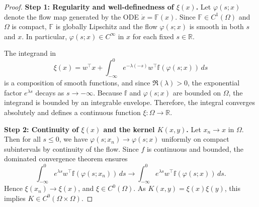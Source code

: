 \documentclass[11pt]{article}
\theoremstyle{plain}
\def\[{\begin{equation}}
\def\]{\end{equation}}
\begin{document}
\begin{proof}
\textbf{Step 1: Regularity and well-definedness of \( \xi(x) \).}  
Let \( \varphi(s; x) \) denote the flow map generated by the ODE \( \dot{x} = {\mathbb F}(x) \). Since \( {\mathbb F} \in C^1(\Omega) \) and \( \Omega \) is compact, \( {\mathbb F} \) is globally Lipschitz and the flow \( \varphi(s; x) \) is smooth in both \( s \) and \( x \). In particular, \( \varphi(s; x) \in C^\infty \) in \( x \) for each fixed \( s \in \mathbb{R} \).

The integrand in
\[
\xi(x) = w^\top x + \int_{-\infty}^0 e^{-\lambda(-s)} w^\top {\mathbb f}(\varphi(s; x)) \, ds
\]
is a composition of smooth functions, and since \( \Re(\lambda) > 0 \), the exponential factor \( e^{\lambda s} \) decays as \( s \to -\infty \). Because \( {\mathbb f} \) and \( \varphi(s; x) \) are bounded on \( \Omega \), the integrand is bounded by an integrable envelope. Therefore, the integral converges absolutely and defines a continuous function \( \xi : \Omega \to \mathbb{R} \).
\medskip

\textbf{Step 2: Continuity of \( \xi(x) \) and the kernel \( K(x, y) \).}  
Let \( x_n \to x \) in \( \Omega \). Then for all \( s \leq 0 \), we have \( \varphi(s; x_n) \to \varphi(s; x) \) uniformly on compact subintervals by continuity of the flow. Since \( f \) is continuous and bounded, the dominated convergence theorem ensures
\[
\int_{-\infty}^0 e^{\lambda s} w^\top {\mathbb f}(\varphi(s; x_n)) \, ds \to \int_{-\infty}^0 e^{\lambda s} w^\top {\mathbb f}(\varphi(s; x)) \, ds.
\]
Hence \( \xi(x_n) \to \xi(x) \), and \( \xi \in C^0(\Omega) \). As \( K(x, y) = \xi(x) \xi(y) \), this implies \( K \in C^0(\Omega \times \Omega) \).


\end{proof}
\end{document}

